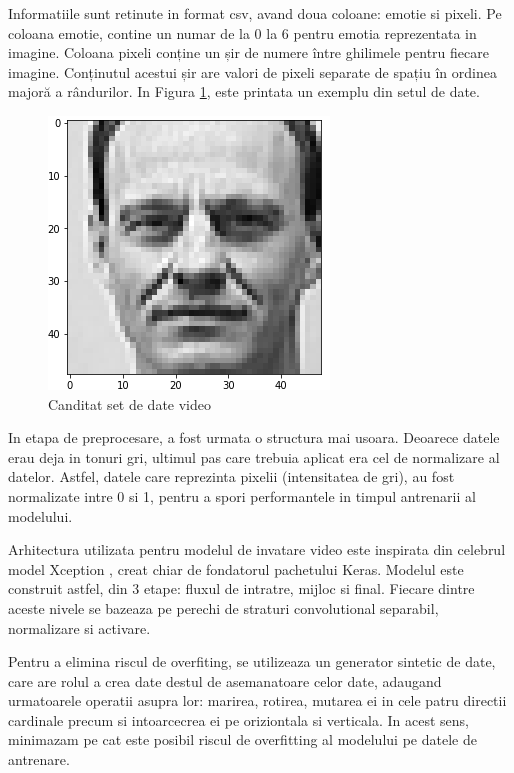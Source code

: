 \documentclass[a4paper, 12pt]{report}
\begin{document}
	Informatiile sunt retinute in format csv, avand doua coloane: emotie si pixeli. Pe coloana emotie, contine un numar de la 0 la 6 pentru emotia reprezentata in imagine. Coloana pixeli conține un șir de numere între ghilimele pentru fiecare imagine. Conținutul acestui șir are valori de pixeli separate de spațiu în ordinea majoră a rândurilor. In Figura \ref{fig:video_dataset_example}, este printata un exemplu din setul de date.
	
	\begin{figure}[H]
		\begin{center} 
			\includegraphics[scale=0.7]{images/video_dataset_example.png}
		\end{center}
		\caption{Canditat set de date video}
		\label{fig:video_dataset_example}
	\end{figure}
	
	In etapa de preprocesare, a fost urmata o structura mai usoara. Deoarece datele erau deja in tonuri gri, ultimul pas care trebuia aplicat era cel de normalizare al datelor. Astfel, datele care reprezinta pixelii (intensitatea de gri), au fost normalizate intre 0 si 1, pentru a spori performantele in timpul antrenarii al modelului.
	
	Arhitectura utilizata pentru modelul de invatare video este inspirata din celebrul model Xception \cite{xception}, creat chiar de fondatorul pachetului Keras. Modelul este construit astfel, din 3 etape: fluxul de intratre, mijloc si final. Fiecare dintre aceste nivele se bazeaza pe perechi de straturi convolutional separabil, normalizare si activare. 
	
	Pentru a elimina riscul de overfiting, se utilizeaza un generator sintetic de date, care are rolul a crea date destul de asemanatoare celor date, adaugand urmatoarele operatii asupra lor: marirea, rotirea, mutarea ei in cele patru directii cardinale precum si intoarcecrea ei pe oriziontala si verticala. In acest sens, minimazam pe cat este posibil riscul de overfitting al modelului pe datele de antrenare.
	
\end{document}
